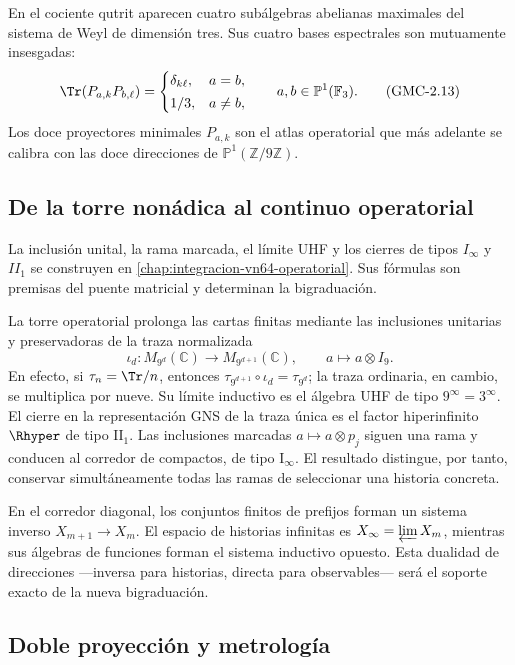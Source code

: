 En el cociente qutrit aparecen cuatro subálgebras abelianas maximales del
sistema de Weyl de dimensión tres. Sus cuatro bases espectrales son
mutuamente insesgadas:
\[
 \Tr(P_{a,k}P_{b,\ell})=
 \begin{cases}
  \delta_{k\ell},&a=b,\\[2pt]
  1/3,&a\ne b,
 \end{cases}
 \qquad a,b\in\mathbb P^1(\mathbb F_3).
 \tag{GMC-2.13}
\]
Los doce proyectores minimales $P_{a,k}$ son el atlas operatorial que más
adelante se calibra con las doce direcciones de
$\mathbb P^1(\mathbb Z/9\mathbb Z)$.

\subsection{De la torre nonádica al continuo operatorial}

La inclusión unital, la rama marcada, el límite UHF y los cierres de tipos
\(I_\infty\) y \(II_1\) se construyen en
\cref{chap:integracion-vn64-operatorial}. Sus fórmulas son premisas del puente
matricial y determinan la bigraduación.

La torre operatorial prolonga las cartas finitas mediante las
inclusiones unitarias y preservadoras de la traza normalizada
\[
 \iota_d:M_{9^d}(\mathbb C)\longrightarrow M_{9^{d+1}}(\mathbb C),
 \qquad a\longmapsto a\otimes I_9.
 \tag{GMC-2.14}
\]
En efecto, si $\tau_n=\Tr/n$, entonces
$\tau_{9^{d+1}}\circ\iota_d=\tau_{9^d}$; la traza ordinaria, en cambio, se
multiplica por nueve. 
Su límite inductivo es el álgebra UHF de tipo $9^\infty=3^\infty$. El cierre
en la representación GNS de la traza única es el factor hiperinfinito
$\Rhyper$ de tipo $\mathrm{II}_1$. Las inclusiones marcadas
$a\mapsto a\otimes p_j$ siguen una rama y conducen al corredor de compactos,
de tipo $\mathrm I_\infty$. El resultado distingue, por tanto, conservar
simultáneamente todas las ramas de seleccionar una historia concreta.

En el corredor diagonal, los conjuntos finitos de prefijos forman un sistema
inverso $X_{m+1}\to X_m$. El espacio de historias infinitas es
$X_\infty=\varprojlim X_m$, mientras sus álgebras de funciones forman el
sistema inductivo opuesto. Esta dualidad de direcciones ---inversa para
historias, directa para observables--- será el soporte exacto de la nueva
bigraduación.

\subsection{Doble proyección y metrología}

